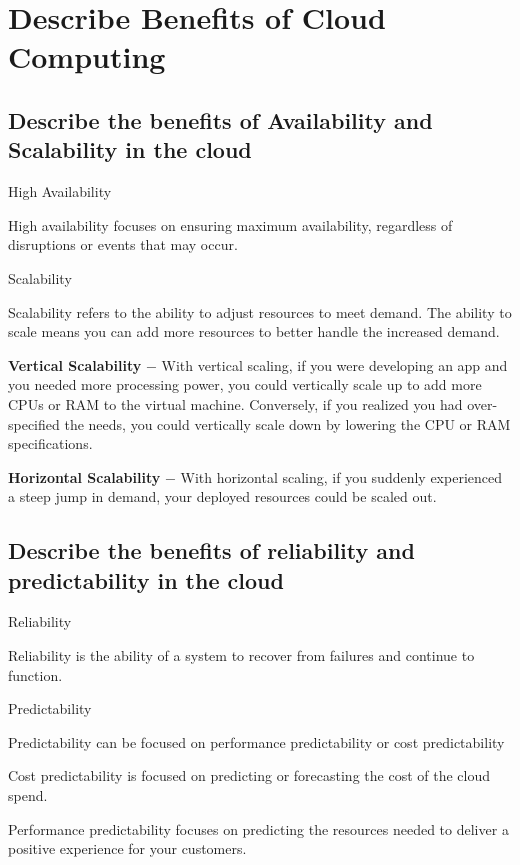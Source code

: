 \documentclass[12pt,a4paper]{report}
\begin{document}
\section{Describe Benefits of Cloud Computing}
\subsection{Describe the benefits of Availability and Scalability in the cloud}
\begin{mylist1}
    \item High Availability
    \begin{mylist2}
        \item High availability focuses on ensuring maximum availability, regardless of disruptions or events that may occur.
    \end{mylist2}
    \item Scalability
    \begin{mylist2}
        \item Scalability refers to the ability to adjust resources to meet demand.
        The ability to scale means you can add more resources to better handle the increased demand.
        \item \textbf{Vertical Scalability} $-$ With vertical scaling, if you were developing an app and you needed more processing power, you could vertically scale up to add more CPUs or RAM to the virtual machine. Conversely, if you realized you had over-specified the needs, you could vertically scale down by lowering the CPU or RAM specifications.
        \item \textbf{Horizontal Scalability} $-$ With horizontal scaling, if you suddenly experienced a steep jump in demand, your deployed resources could be scaled out. 
    \end{mylist2}
\end{mylist1}
\subsection{Describe the benefits of reliability and predictability in the cloud}
\begin{mylist1}
    \item Reliability
    \begin{mylist2}
        \item Reliability is the ability of a system to recover from failures and continue to function.
    \end{mylist2}
    \item Predictability
    \begin{mylist2}
        \item Predictability can be focused on performance predictability or cost predictability
        \item Cost predictability is focused on predicting or forecasting the cost of the cloud spend. 
        \item Performance predictability focuses on predicting the resources needed to deliver a positive experience for your customers.
    \end{mylist2}
\end{mylist1}
\end{document}

